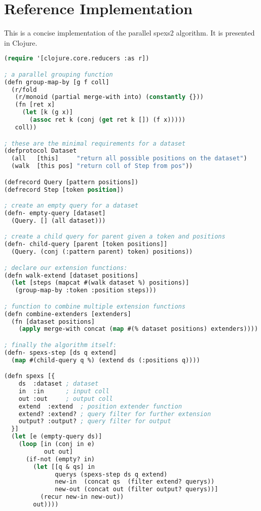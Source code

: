 \chapter{Reference Implementation}
\label{add:concise}

This is a concise implementation of the parallel spexs2 algorithm. It is presented in Clojure\cite{clojure}.

\begin{lstlisting}[language=Lisp]
(require '[clojure.core.reducers :as r])

; a parallel grouping function
(defn group-map-by [g f coll]
  (r/fold 
   (r/monoid (partial merge-with into) (constantly {}))
   (fn [ret x]
     (let [k (g x)]
       (assoc ret k (conj (get ret k []) (f x)))))
   coll))

; these are the minimal requirements for a dataset
(defprotocol Dataset
  (all   [this]     "return all possible positions on the dataset")
  (walk  [this pos] "return coll of Step from pos"))

(defrecord Query [pattern positions])
(defrecord Step [token position])

; create an empty query for a dataset
(defn- empty-query [dataset]
  (Query. [] (all dataset)))

; create a child query for parent given a token and positions
(defn- child-query [parent [token positions]]
  (Query. (conj (:pattern parent) token) positions))

; declare our extension functions:
(defn walk-extend [dataset positions]
  (let [steps (mapcat #(walk dataset %) positions)]
   (group-map-by :token :position steps)))

; function to combine multiple extension functions
(defn combine-extenders [extenders]
  (fn [dataset positions] 
    (apply merge-with concat (map #(% dataset positions) extenders))))

; finally the algorithm itself:
(defn- spexs-step [ds q extend]
  (map #(child-query q %) (extend ds (:positions q))))

(defn spexs [{
    ds  :dataset ; dataset
    in  :in      ; input coll
    out :out     ; output coll
    extend  :extend  ; position extender function
    extend? :extend? ; query filter for further extension
    output? :output? ; query filter for output
  }]
  (let [e (empty-query ds)]
    (loop [in (conj in e)
           out out]
      (if-not (empty? in)
        (let [[q & qs] in
              querys (spexs-step ds q extend)
              new-in  (concat qs  (filter extend? querys))
              new-out (concat out (filter output? querys))]
          (recur new-in new-out))
        out))))


\end{lstlisting}
